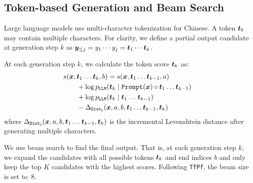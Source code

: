 \subsection{Token-based Generation and Beam Search}
Large language models use multi-character tokenization for Chinese.
A token ${\boldsymbol{t}}_k$ may contain multiple characters.
For clarity, we define a partial output candidate at generation step $k$ as ${\boldsymbol{y}}_{\le j}=y_1\cdots{}y_j={\boldsymbol{t}}_1\cdots{\boldsymbol{t}}_k$.

At each generation step $k$, we calculate the token score ${\boldsymbol{t}}_k$ as:
\begin{equation*}
    \begin{aligned}
         & s({\boldsymbol{x}}, {\boldsymbol{t}}_1\dots{\boldsymbol{t}}_k, b) = s({\boldsymbol{x}}, {\boldsymbol{t}}_1\dots{\boldsymbol{t}}_{k-1}, a)          \\
         & \qquad + \log p_{\mathtt{LLM}}({\boldsymbol{t}}_k\mid \mathtt{Prompt}({\boldsymbol{x}}) \circ {\boldsymbol{t}}_1\dots{\boldsymbol{t}}_{k-1}) \\
         & \qquad + \log p_{\mathtt{LLM}}({\boldsymbol{t}}_k\mid {\boldsymbol{t}}_1\dots{\boldsymbol{t}}_{k-1})                                      \\
         & \qquad - \Delta_{\mathtt{Dist}_{\mathtt{L}}}({\boldsymbol{x}}, a, b, {\boldsymbol{t}}_1\dots{\boldsymbol{t}}_{k-1}, {\boldsymbol{t}}_k)
    \end{aligned}
\end{equation*}
where $\Delta_{\mathtt{Dist}_{\mathtt{L}}}({\boldsymbol{x}}, a, b, {\boldsymbol{t}}_1\dots{\boldsymbol{t}}_{k-1}, {\boldsymbol{t}}_k)$ is the incremental Levenshtein distance after generating multiple characters.

We use beam search to find the final output.
That is, at each generation step $k$, we expand the candidates with all possible tokens ${\boldsymbol{t}}_k$ and end indices $b$ and only keep the top $K$ candidates with the highest scores.
Following \texttt{TfPf}, the beam size is set to~8.

